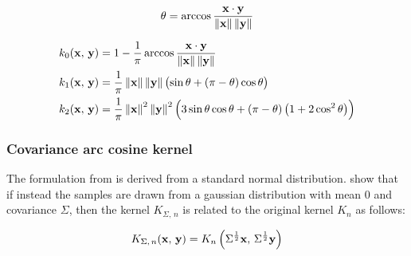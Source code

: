 \begin{equation}
	\theta = \arccos\frac{\mathbf{x} \cdot \mathbf{y}}{\left\lVert \mathbf{x} \right\rVert \left\lVert \mathbf{y} \right\rVert}
\end{equation}


\begin{align}
	k_0(\mathbf{x},\,\mathbf{y}) & = 1 - \frac{1}{\pi} \arccos\frac{\mathbf{x} \cdot \mathbf{y}}{\left\lVert \mathbf{x} \right\rVert \left\lVert \mathbf{y} \right\rVert} \\
	k_1(\mathbf{x},\,\mathbf{y}) & = \frac{1}{\pi} \left\lVert \mathbf{x} \right\rVert \left\lVert \mathbf{y} \right\rVert
	\bigl( \sin\theta + \left(\pi - \theta\right)\cos\theta \bigr)                                                        \\
	k_2(\mathbf{x},\,\mathbf{y}) & = \frac{1}{\pi} \left\lVert \mathbf{x} \right\rVert^2 \left\lVert \mathbf{y} \right\rVert^2
	\Bigl( 3\sin\theta\cos\theta + \left(\pi - \theta\right)\left(1 + 2\cos^2\theta\right) \Bigr)
\end{align}

\subsubsection{Covariance arc cosine kernel}

The formulation from \textcite{choLargemarginClassificationInfinite2010} is derived from a standard normal
distribution. \Textcite{pandeyGoDeepWide2014} show that if instead the samples are drawn from a gaussian
distribution with mean 0 and covariance $\Sigma$, then the kernel $K_{\Sigma,\,n}$ is related to the
original kernel $K_{n}$ as follows:

\begin{equation}\label{eq:kernel_pandey}
K_{\Sigma,\,n}(\mathbf{x},\,\mathbf{y}) = K_{n}\left(\Sigma^{\frac{1}{2}}\mathbf{x},\,\Sigma^{\frac{1}{2}}\mathbf{y}\right)
\end{equation}
